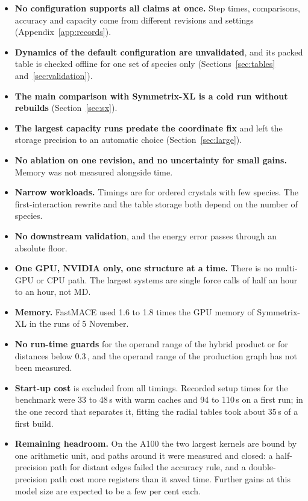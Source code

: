 \documentclass[11pt]{article}
\newcommand{\angstrom}{\text{\AA}}
\begin{document}
\begin{itemize}\setlength{\itemsep}{0.15em}
\item \textbf{No configuration supports all claims at once.} Step times, comparisons, accuracy and capacity come
      from different revisions and settings (Appendix~\ref{app:records}).
\item \textbf{Dynamics of the default configuration are unvalidated}, and its packed table is checked offline
      for one set of species only (Sections~\ref{sec:tables} and~\ref{sec:validation}).
\item \textbf{The main comparison with Symmetrix-XL is a cold run without rebuilds}
      (Section~\ref{sec:sx}).
\item \textbf{The largest capacity runs predate the coordinate fix} and left the storage precision to an
      automatic choice (Section~\ref{sec:large}).
\item \textbf{No ablation on one revision, and no uncertainty for small gains.} Memory was not measured
      alongside time.
\item \textbf{Narrow workloads.} Timings are for ordered crystals with few species. The first-interaction
      rewrite and the table storage both depend on the number of species.
\item \textbf{No downstream validation}, and the energy error passes through an absolute floor.
\item \textbf{One GPU, NVIDIA only, one structure at a time.} There is no multi-GPU or CPU path. The largest
      systems are single force calls of half an hour to an hour, not MD.
\item \textbf{Memory.} FastMACE used 1.6 to 1.8 times the GPU memory of Symmetrix-XL in the runs of
      5 November.
\item \textbf{No run-time guards} for the operand range of the hybrid product or for distances below
      0.3\,\angstrom{}, and the operand range of the production graph has not been measured.
\item \textbf{Start-up cost} is excluded from all timings. Recorded setup times for the benchmark were 33 to
      48\,s with warm caches and 94 to 110\,s on a first run; in the one record that separates it, fitting the
      radial tables took about 35\,s of a first build.
\item \textbf{Remaining headroom.} On the A100 the two largest kernels are bound by one arithmetic unit, and
      paths around it were measured and closed: a half-precision path for distant edges failed the accuracy rule,
      and a double-precision path cost more registers than it saved time. Further gains at this model size are
      expected to be a few per cent each.
\end{itemize}
\end{document}
